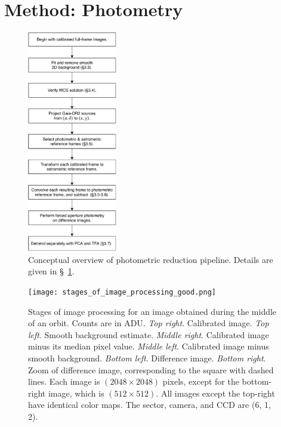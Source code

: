 \documentclass[12pt,twocolumn,tighten]{aastex62}
\begin{document}
\section{Method: Photometry}
\label{sec:method}

\begin{figure}[!t]
	\begin{center}
		\leavevmode
		\includegraphics[width=0.35\textwidth]{pipelineoverview.pdf}
	\end{center}
	\vspace{-0.2cm}
	\caption{
    Conceptual overview of photometric reduction pipeline.
    Details are given in \S~\ref{sec:method}.
	\label{fig:pipeline}
	}
\end{figure}

\begin{figure}[!t]
    \begin{center}
        \leavevmode
        \texttt{[image: stages\_of\_image\_processing\_good.png]}
    \end{center}
    \vspace{-0.9cm}
    \caption{
        Stages of image processing for an image obtained during the middle
        of an orbit. Counts are in ADU.
        {\it Top right}. Calibrated image.
        {\it Top left}. Smooth background estimate.
        {\it Middle right}. Calibrated image minus its median pixel value.
        {\it Middle left}. Calibrated image minus smooth background.
        {\it Bottom left}. Difference image.
        {\it Bottom right}. Zoom of difference image, corresponding to
        the square with dashed lines.
        Each image is $(2048\times2048)$ pixels, except for the
        bottom-right image, which is $(512\times512)$.  All images
        except the top-right have identical color maps.  The sector,
        camera, and CCD are (6, 1, 2).
        \label{fig:stages_good}
    }
\end{figure}
\end{document}
